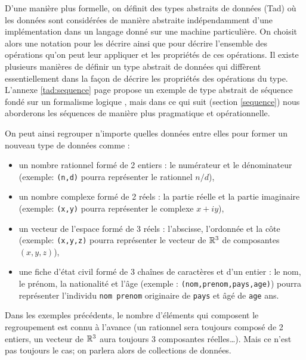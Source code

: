 D'une manière plus formelle, on définit des types abstraits de données ({\sc Tad})
 où les données sont considérées de manière abstraite 
indépendamment d'une implémentation dans un langage donné sur une machine particulière. 
On choisit alors une notation pour les décrire ainsi que pour décrire l'ensemble des opérations 
qu'on peut leur appliquer et les propriétés de ces opérations. Il existe plusieurs 
manières de définir un type abstrait de données qui diffèrent essentiellement
dans la façon de décrire les propriétés des opérations du type. 
L'annexe \ref{tad:sequence} page \pageref{tad:sequence} propose un exemple de 
type abstrait de séquence fondé sur un formalisme logique \cite{manna}\label{cite:manna}, mais dans ce qui suit
(section \ref{sequence}) nous aborderons les séquences de manière plus pragmatique et opérationnelle.

On peut ainsi regrouper n'importe quelles données entre elles pour former un nouveau 
type de données comme :
\begin{itemize}
\item un nombre rationnel formé de 2 entiers : le numérateur et le dénominateur
	(exemple: {\tt (n,d)} pourra représenter le rationnel $n/d$), 
\item un nombre complexe formé de 2 réels : la partie réelle et la partie 
	imaginaire (exemple: {\tt (x,y)} pourra représenter le complexe $x+iy$),
\item un vecteur de l'espace formé de 3 réels : l'abscisse, l'ordonnée
	et la côte (exemple: {\tt (x,y,z)} pourra représenter le vecteur de ${\Bbb R}^3$
	de composantes $(x,y,z)$),
\item une fiche d'état civil formé de 3 chaînes de caractères et d'un entier : 
	le nom, le prénom, la nationalité et l'âge (exemple : {\tt (nom,prenom,pays,age)})
	pourra représenter l'individu {\tt nom prenom} originaire de {\tt pays} et âgé
	de {\tt age} ans.
\end{itemize}
Dans les exemples précédents, le nombre d'éléments qui composent le regroupement
est connu à l'avance (un rationnel sera toujours composé de 2 entiers, un vecteur de $\Bbb R^3$
aura toujours 3 composantes réelles\ldots). Mais ce n'est pas toujours le cas; on parlera alors 
de collections de données.

